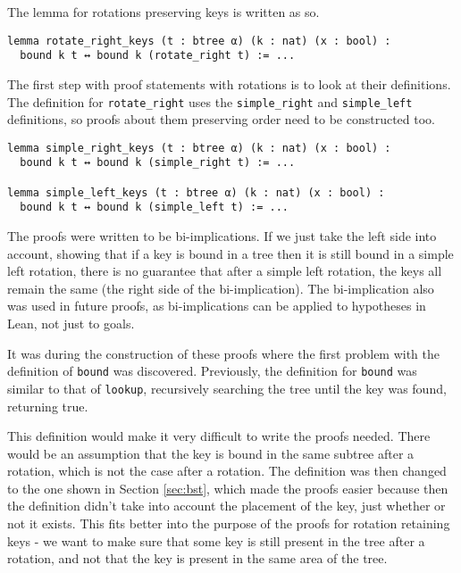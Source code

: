 The lemma for rotations preserving keys is written as so.

\begin{lstlisting}
lemma rotate_right_keys (t : btree α) (k : nat) (x : bool) :
  bound k t ↔ bound k (rotate_right t) := ...
\end{lstlisting}

The first step with proof statements with rotations is to look at their definitions. The definition for \lstinline{rotate_right} uses the \lstinline{simple_right} and \lstinline{simple_left} definitions, so proofs about them preserving order need to be constructed too.

\begin{lstlisting}
lemma simple_right_keys (t : btree α) (k : nat) (x : bool) :
  bound k t ↔ bound k (simple_right t) := ...
  
lemma simple_left_keys (t : btree α) (k : nat) (x : bool) :
  bound k t ↔ bound k (simple_left t) := ...
\end{lstlisting}

The proofs were written to be bi-implications. If we just take the left side into account, showing that if a key is bound in a tree then it is still bound in a simple left rotation, there is no guarantee that after a simple left rotation, the keys all remain the same (the right side of the bi-implication). The bi-implication also was used in future proofs, as bi-implications can be applied to hypotheses in Lean, not just to goals. 

It was during the construction of these proofs where the first problem with the definition of \lstinline{bound} was discovered. Previously, the definition for \lstinline{bound} was similar to that of \lstinline{lookup}, recursively searching the tree until the key was found, returning true.

This definition would make it very difficult to write the proofs needed. There would be an assumption that the key is bound in the same subtree after a rotation, which is not the case after a rotation. The definition was then changed to the one shown in Section \ref{sec:bst}, which made the proofs easier because then the definition didn't take into account the placement of the key, just whether or not it exists. This fits better into the purpose of the proofs for rotation retaining keys - we want to make sure that some key is still present in the tree after a rotation, and not that the key is present in the same area of the tree.